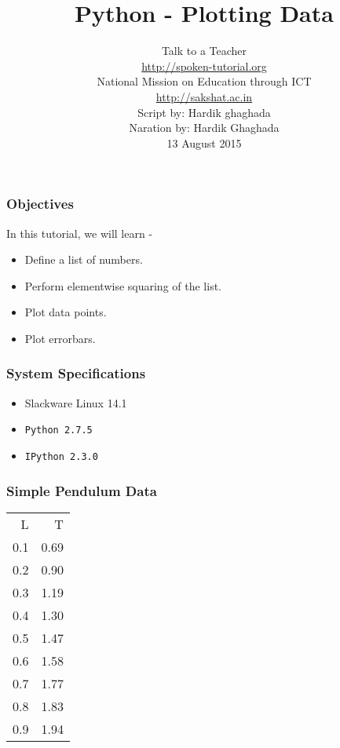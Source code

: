\documentclass[17pt,compress]{beamer}
\author[FOSSEE]{}
\institute[IIT Bombay]{}
\date[]{}
\begin{document}
\sffamily \bfseries
\title
[Plotting Data]
{Python - Plotting Data}
\author
[FOSSEE, IIT - Bombay]
{\small Talk to a Teacher\\{\color{blue}\url{http://spoken-tutorial.org}}\\National Mission on Education
 through ICT\\{\color{blue}\url{http://sakshat.ac.in}} \\[0.5cm]{\tiny Script by: Hardik ghaghada \\ Naration by: Hardik Ghaghada \\ 13 August 2015}}

\begin{frame}
   \titlepage
\end{frame}
\begin{frame}
\frametitle{Objectives}
\label{sec-2}

In this tutorial, we will learn -\pause

\begin{itemize}
\item Define a list of numbers.\pause
\item Perform elementwise squaring of the list. \pause
\item Plot data points.\pause
\item Plot errorbars.
\end{itemize}
\end{frame}
\begin{frame}
\frametitle{System Specifications}\pause
\begin{itemize}
\item Slackware Linux 14.1\pause
\item \texttt{Python 2.7.5} \pause
\item \texttt{IPython 2.3.0}
\end{itemize}
\end{frame}
\begin{frame}
\frametitle{Simple Pendulum Data}
\label{sec-3}

\begin{center}
\begin{small}
\begin{tabular}{rr}
   L  &     T  \\
 0.1  &  0.69  \\
 0.2  &  0.90  \\
 0.3  &  1.19  \\
 0.4  &  1.30  \\
 0.5  &  1.47  \\
 0.6  &  1.58  \\
 0.7  &  1.77  \\
 0.8  &  1.83  \\
 0.9  &  1.94  \\
\end{tabular}
\end{small}
\end{center}  
\end{frame}
\end{document}
